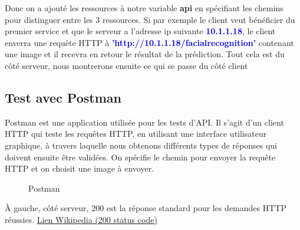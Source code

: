 {Donc on a ajouté les ressources à notre variable \textbf{api} en spécifiant les chemins pour distinguer entre les 3 ressources. Si par exemple le client veut bénéficier du premier service et que le serveur a l'adresse ip suivante \textbf{\textcolor{blue}{10.1.1.18}}, le client enverra une requête HTTP à \textbf{\textcolor{blue}{'http://10.1.1.18/facialrecognition'}} contenant une image et il recevra en retour le résultat de la prédiction. Tout cela est du côté serveur, nous montrerons ensuite ce qui se passe du côté client

    \subsection{Test avec Postman}

Postman est une application utilisée pour les tests d'API. Il s'agit d'un client HTTP qui teste les requêtes HTTP, en utilisant une interface utilisateur graphique, à travers laquelle nous obtenons différents types de réponses qui doivent ensuite être validées. On spécifie le chemin pour envoyer la requête HTTP et on choisit une image à envoyer.

\begin{figure}[H] 
\centering
{}
\caption{Postman}
\label{fig:figure10}
\end{figure}

À gauche, côté serveur, 200 est la réponse standard pour les demandes HTTP réussies.
\href{https://en.wikipedia.org/wiki/List_of_HTTP_status_codes#200}{Lien Wikipedia (200 status code)}









\pagebreak

}
